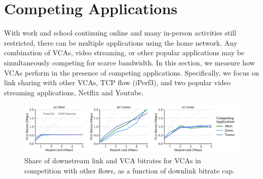 \section{Competing Applications}
\label{sec:competition}
With work and school continuing online and many in-person activities still restricted, there can be multiple applications using the home network. Any combination of VCAs, video streaming, or other popular applications may be simultaneously competing for scarce bandwidth. In this section, we measure how VCAs perform in the presence of competing applications. Specifically, we focus on link sharing with other VCAs, TCP flow (iPerf3), and two popular video streaming applications, Netflix and Youtube. 

    





\begin{figure}[t]
    \includegraphics[width=\linewidth]{figures/comp/dl_competition_vca.pdf}
    \caption{Share of downstream link and VCA bitrates for VCAs in competition with other flows, as a function of downlink bitrate cap.}
	\label{fig:comp_bitrates_dl}
\end{figure}

